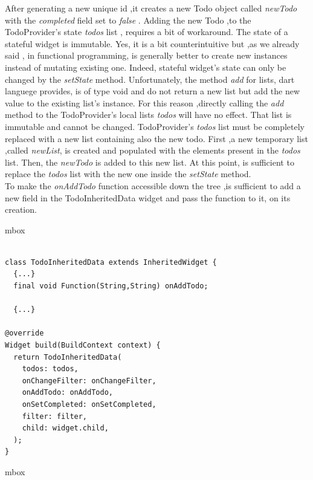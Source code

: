 After generating a new unique id ,it creates a new Todo object called \textit{newTodo }with the \textit{completed }field set to \textit{false }. Adding the new Todo ,to the TodoProvider’s state \textit{todos }list , requires a bit of workaround. The state of a stateful widget is immutable. Yes, it is a bit counterintuitive but ,as we already said , in functional programming, is generally better to create new instances instead of mutating existing one. Indeed, stateful widget's state can only be changed by the \textit{setState } method. Unfortunately, the method \textit{add} for lists, dart languege provides, is of type void and do not return a new list but add the new value to the existing list's instance. For this reason ,directly calling the \textit{add} method to the TodoProvider’s local lists \textit{todos }will have no effect. That list is immutable and cannot be changed.
TodoProvider’s \textit{todos }list must be completely replaced with a new list containing also the new todo. First ,a new temporary list ,called \textit{newList}, is created and populated with the elements present in the \textit{todos }list. Then, the \textit{newTodo }is added to this new list. At this point, is sufficient to replace the \textit{todos }list with the new one inside the \textit{setState} method.\\
To make the \textit{onAddTodo} function accessible down the tree ,is sufficient to add a new field in the TodoInheritedData widget and pass the function to it, on its creation.
\mbox{}\\

\begin{code}

mbox{}\\

\label{code:2.32}
\begin{verbatim}

class TodoInheritedData extends InheritedWidget {
  {...}
  final void Function(String,String) onAddTodo;

  {...}

@override
Widget build(BuildContext context) {
  return TodoInheritedData(
    todos: todos,
    onChangeFilter: onChangeFilter,
    onAddTodo: onAddTodo,
    onSetCompleted: onSetCompleted,
    filter: filter,
    child: widget.child,
  );
}
\end{verbatim}
\end{code}
mbox{}\\

